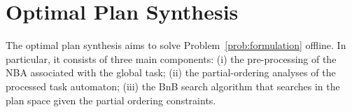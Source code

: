 \section{Optimal Plan Synthesis}\label{subsec:initial-synthesis}
The optimal plan synthesis aims to solve Problem~\ref{prob:formulation} offline.
In particular, it consists of three main components:
(i) the pre-processing of the NBA associated with the global task;
(ii) the partial-ordering analyses of the processed task automaton;
(iii) the BnB search algorithm that searches in the plan space
given the partial ordering constraints.
